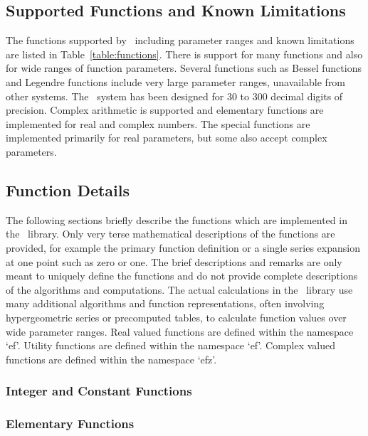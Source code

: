 \subsection{Supported Functions and Known Limitations}



The functions supported by \efloat\ including parameter ranges and
known limitations are listed in Table~\ref{table:functions}.
There is support for many functions and also
for wide ranges of function parameters.
Several functions such as Bessel functions and Legendre functions
include very large parameter ranges, unavailable from other systems.
The \efloat\ system has been designed for $30$ to $300$ decimal digits of precision.
Complex arithmetic is supported and elementary
functions are implemented for real and complex numbers.
The special functions are implemented primarily for real parameters,
but some also accept complex parameters.

\pagebreak

\subsection{Function Details}

The following sections briefly describe the functions which are implemented in
the \efloat\ library. Only very terse mathematical descriptions of the functions
are provided, for example the primary function definition or a single series
expansion at one point such as zero or one. The brief descriptions and
remarks are only meant to uniquely define the functions and do not provide
complete descriptions of the algorithms and computations. The actual calculations
in the \efloat\ library use many additional algorithms and function representations,
often involving hyper\-geometric series or precomputed tables, to calculate function
values over wide parameter ranges. Real valued functions are defined
within the name\-space `{\courier ef}'. Utility functions are defined
within the name\-space `{\courier ef}'. Complex valued functions are defined
within the name\-space `{\courier efz}'.

\subsubsection{Integer and Constant Functions} 
\subsubsection{Elementary Functions}           
